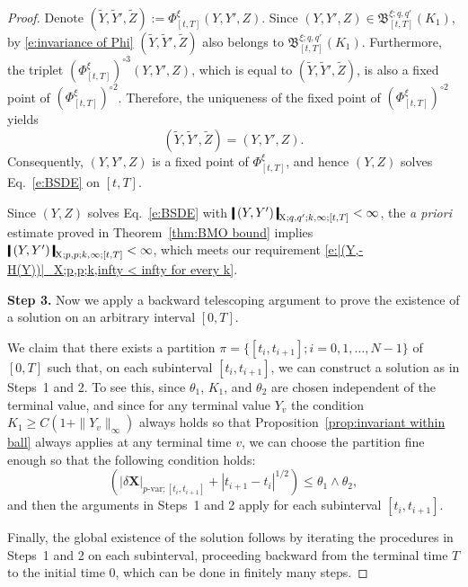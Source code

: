 \documentclass[11pt,reqno]{amsart}
\numberwithin{equation}{section}
\newcommand{\shortthickbar}{%
  \vcenter{\hbox{\rule{1.8pt}{2.2ex}}}%
}
\newcommand{\thicknm}[1]{%
  \mathopen{\shortthickbar}%
  \mkern4mu #1 \mkern4mu%
  \mathclose{\shortthickbar}%
}
\begin{document}
\begin{proof}
Denote $(\tilde Y,\tilde Y',\tilde Z) := \Phi^{\xi}_{[t,T]}(Y,Y',Z)$. Since $(Y,Y',Z) \in \mathfrak B^{\xi;q,q'}_{[t,T]}(K_1)$, by \eqref{e:invariance of Phi} $(\tilde Y,\tilde Y',\tilde Z)$ also belongs to $\mathfrak B^{\xi;q,q'}_{[t,T]}(K_1)$. Furthermore, the triplet  $(\Phi^{\xi}_{[t,T]})^{\circ 3}(Y,Y',Z)$, which is equal to $(\tilde Y,\tilde Y',\tilde Z)$, is also a fixed point of $(\Phi^{\xi}_{[t,T]})^{\circ 2}$. Therefore, the uniqueness of the fixed point of $(\Phi^{\xi}_{[t,T]})^{\circ 2}$ yields 
\begin{equation*}
(\tilde Y,\tilde Y',\tilde Z) = (Y,Y',Z). 
\end{equation*}
Consequently, $(Y,Y',Z)$ is a fixed point of $\Phi^{\xi}_{[t,T]}$, and hence $(Y,Z)$ solves Eq.~\eqref{e:BSDE} on $[t,T]$.

Since $(Y,Z)$ solves Eq.~\eqref{e:BSDE} with $\thicknm{(Y,Y')}_{\mathrm X;q,q';k,\infty;[t,T]} < \infty$, the \emph{a priori} estimate proved in Theorem~\ref{thm:BMO bound} implies $\thicknm{(Y,Y')}_{\mathrm X;p,p;k,\infty;[t,T]} < \infty$, which meets our requirement \eqref{e:|(Y,-H(Y))|_X;p,p;k,infty < infty for every k}. 

\textbf{Step 3.}
Now we apply a backward telescoping argument to prove the existence of a solution on an arbitrary interval $[0,T]$. 

We claim that there exists a partition $\pi=\{[t_i,t_{i+1}]; i=0,1,\ldots,N-1\}$ of $[0,T]$ such that, on each subinterval $[t_i,t_{i+1}]$, we can construct a solution as in Steps~1 and 2. To see this, since $\theta_1$, $K_1$, and $\theta_2$ are chosen independent of the terminal value, and since for any terminal value $Y_v$ the condition $K_1 \ge C(1 + \|Y_v\|_{\infty})$ always holds so that Proposition~\ref{prop:invariant within ball} always applies at any terminal time $v$, we can choose the partition fine enough so that the following condition holds:  
\begin{equation*}
(|\delta \mathbf X|_{p\text{-}\mathrm{var};[t_i,t_{i+1}]} + |t_{i+1} - t_{i}|^{1/2}) \le \theta_1 \land \theta_2, 
\end{equation*}
and then the arguments in Steps~1 and 2 apply for each subinterval $[t_i,t_{i+1}]$.  

Finally, the global existence of the solution follows by iterating the procedures in Steps~1 and 2 on each subinterval, proceeding backward from the terminal time $T$ to the initial time $0$, which can be done in finitely many steps.
\end{proof}
\end{document}
